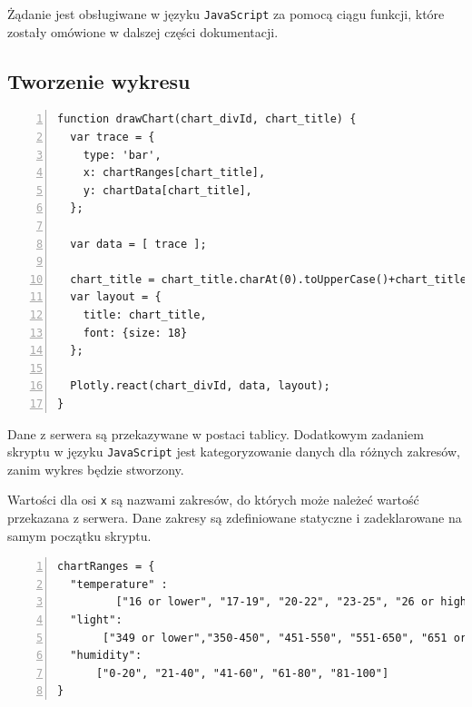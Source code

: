 \documentclass[a4paper]{article}
\begin{document}
	Żądanie jest obsługiwane w języku \texttt{JavaScript} za pomocą ciągu funkcji, które zostały omówione w dalszej części dokumentacji.

    \subsection{Tworzenie wykresu}
    \begin{lstlisting}[frame=single, numbers=left, basicstyle=\ttfamily\small,
    caption={Funkcja do tworzenia histogramu za pomocą biblioteki \textsl{Plotly.js}}]
function drawChart(chart_divId, chart_title) {
  var trace = {
    type: 'bar',
    x: chartRanges[chart_title],
    y: chartData[chart_title],
  };

  var data = [ trace ];

  chart_title = chart_title.charAt(0).toUpperCase()+chart_title.slice(1);
  var layout = {
    title: chart_title,
    font: {size: 18}
  };

  Plotly.react(chart_divId, data, layout);
}
    \end{lstlisting}

    Dane z serwera są przekazywane w postaci tablicy. 
    Dodatkowym zadaniem skryptu w języku \texttt{JavaScript} jest kategoryzowanie danych
    dla różnych zakresów, zanim wykres będzie stworzony.

    Wartości dla osi \texttt{x} są nazwami zakresów, 
    do których może należeć wartość przekazana z serwera. 
    Dane zakresy są zdefiniowane statyczne i zadeklarowane na samym początku skryptu.
    \begin{lstlisting}[frame=single, numbers=left, basicstyle=\ttfamily\small,
caption={Zdefiniowany zakresy w skrypcie \texttt{JavaScript}}]
chartRanges = {
  "temperature" :
	     ["16 or lower", "17-19", "20-22", "23-25", "26 or higher"],
  "light": 
       ["349 or lower","350-450", "451-550", "551-650", "651 or higher"],
  "humidity":
	  ["0-20", "21-40", "41-60", "61-80", "81-100"]
}
    \end{lstlisting}
\end{document}
